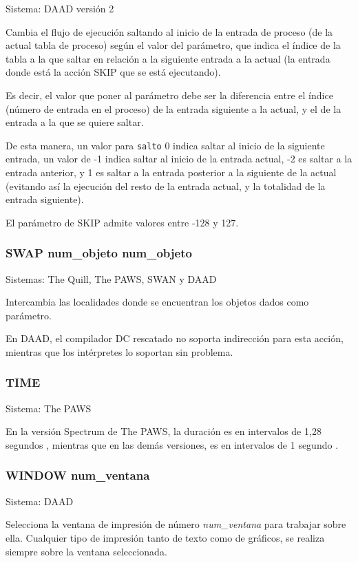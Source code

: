 \documentclass[11pt, a5paper]{article}
\newcommand{\quill}{\textsf{The Quill}\xspace}
\newcommand{\paw}{\textsf{The PAWS}\xspace}
\newcommand{\swan}{\textsf{SWAN}\xspace}
\newcommand{\daad}{\textsf{DAAD}\xspace}
\newcommand{\sistema}[1]{\noindent Sistema: #1 \nopagebreak}
\newcommand{\sistemas}[1]{\noindent Sistemas: #1 \nopagebreak}
\begin{document}
\sistema{\daad versión 2}

Cambia el flujo de ejecución saltando al inicio de la entrada de proceso (de la actual tabla de proceso) según el valor del parámetro, que indica el índice de la tabla a la que saltar en relación a la siguiente entrada a la actual (la entrada donde está la acción SKIP que se está ejecutando).

Es decir, el valor que poner al parámetro debe ser la diferencia entre el índice (número de entrada en el proceso) de la entrada siguiente a la actual, y el de la entrada a la que se quiere saltar.

De esta manera, un valor para \texttt{salto} 0 indica saltar al inicio de la siguiente entrada, un valor de -1 indica saltar al inicio de la entrada actual, -2 es saltar a la entrada anterior, y 1 es saltar a la entrada posterior a la siguiente de la actual (evitando así la ejecución del resto de la entrada actual, y la totalidad de la entrada siguiente).

El parámetro de SKIP admite valores entre -128 y 127.

\subsubsection{SWAP num\_objeto num\_objeto}

\sistemas{\quill, \paw, \swan y \daad}

Intercambia las localidades donde se encuentran los objetos dados como parámetro.

En \daad, el compilador DC rescatado no soporta indirección para esta acción, mientras que los intérpretes lo soportan sin problema.

\subsubsection{TIME}

\sistema{\paw}

En la versión Spectrum de \paw, la duración es en intervalos de 1,28 segundos \cite{PawsZX}, mientras que en las demás versiones, es en intervalos de 1 segundo \cite{PawsPC}.

\subsubsection{WINDOW num\_ventana}

\sistema{\daad}

Selecciona la ventana de impresión de número \emph{num\_ventana} para trabajar sobre ella. Cualquier tipo de impresión tanto de texto como de gráficos, se realiza siempre sobre la ventana seleccionada.
\end{document}
